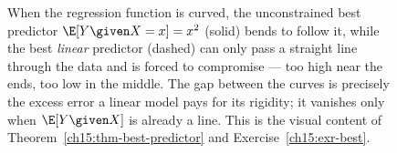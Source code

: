 \begin{figure}[H]
\centering
{}
\caption{When the regression function is curved, the unconstrained best predictor
$\E[Y\given X=x] = x^2$ (solid) bends to follow it, while the best \emph{linear} predictor (dashed) can
only pass a straight line through the data and is forced to compromise --- too high near the ends, too
low in the middle. The gap between the curves is precisely the excess error a linear model pays for its
rigidity; it vanishes only when $\E[Y\given X]$ is already a line. This is the visual content of
Theorem~\ref{ch15:thm-best-predictor} and Exercise~\ref{ch15:exr-best}.}
\label{ch15:fig-nonlinear}
\end{figure}

